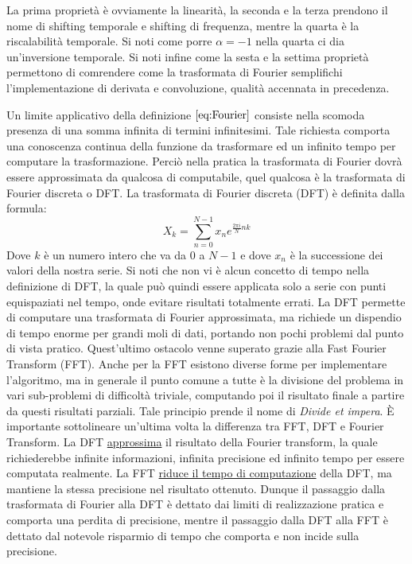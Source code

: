 \documentclass[12pt,a4paper, twoside, openright]{report}
\begin{document}
La prima proprietà è ovviamente la linearità, la seconda e la terza prendono il nome di shifting temporale e shifting di frequenza, mentre la quarta è la riscalabilità temporale.
Si noti come porre $\alpha = -1$ nella quarta ci dia un'inversione temporale.
Si noti infine come la sesta e la settima proprietà permettono di comrendere come la trasformata di Fourier semplifichi l'implementazione di derivata e convoluzione, qualità accennata in precedenza.
\newline

Un limite applicativo della definizione $\ref{eq:Fourier}$ consiste nella scomoda presenza di una somma infinita di termini infinitesimi.
Tale richiesta comporta una conoscenza continua della funzione da trasformare ed un infinito tempo per computare la trasformazione.
Perciò nella pratica la trasformata di Fourier dovrà essere approssimata da qualcosa di computabile, quel qualcosa è la trasformata di Fourier discreta o DFT.
La trasformata di Fourier discreta (DFT) è definita dalla formula:
\begin{equation}
	\label{eq:DFT}
	X_k=\sum_{n=0}^{N-1} x_ne^{\frac{2 \pi i}{N} nk}
\end{equation}
Dove $k$ è un numero intero che va da 0 a $N-1$ e dove $x_n$ è la successione dei valori della nostra serie.
Si noti che non vi è alcun concetto di tempo nella definizione di DFT, la quale può quindi essere applicata solo a serie con punti equispaziati nel tempo, onde evitare risultati totalmente errati.
La DFT permette di computare una trasformata di Fourier approssimata, ma richiede un dispendio di tempo enorme per grandi moli di dati, portando non pochi problemi dal punto di vista pratico.
Quest'ultimo ostacolo venne superato grazie alla Fast Fourier Transform (FFT).
Anche per la FFT esistono diverse forme per implementare l'algoritmo, ma in generale il punto comune a tutte è la divisione del problema in vari sub-problemi di difficoltà triviale, computando poi il risultato finale a partire da questi risultati parziali.
Tale principio prende il nome di \textit{Divide et impera}.
È importante sottolineare un'ultima volta la differenza tra FFT, DFT e Fourier Transform.
La DFT \underline{approssima} il risultato della Fourier transform, la quale richiederebbe infinite informazioni, infinita precisione ed infinito tempo per essere computata realmente.
La FFT \underline{riduce il tempo di computazione} della DFT, ma mantiene la stessa precisione nel risultato ottenuto.
Dunque il passaggio dalla trasformata di Fourier alla DFT è dettato dai limiti di realizzazione pratica e comporta una perdita di precisione, mentre il passaggio dalla DFT alla FFT è dettato dal notevole risparmio di tempo che comporta e non incide sulla precisione. 
\end{document}

